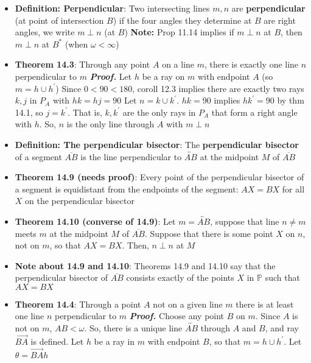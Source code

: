 \documentclass{report}
\begin{document}
\begin{itemize}
        \item \textbf{Definition: Perpendicular}: Two intersecting lines $m,n$ are \textbf{perpendicular} (at point of intersection $B$) if the four angles they determine at $B$ are right angles, we write $m\perp n$ (at $B$)
            \bigbreak \noindent 
            \textbf{Note:} Prop 11.14 implies if $m \perp n$ at $B$, then $m \perp n$ at $B^{*} $ (when $\omega < \infty $)
        \item \textbf{Theorem 14.3}: Through any point $A$ on a line $m$, there is exactly one line $n$ perpendicular to $m$
            \bigbreak \noindent 
            \textbf{\textit{Proof.}} Let $h$ be a ray on $m$ with endpoint $A$ (so $m = h \cup h^{\prime} $)
            \bigbreak \noindent 
            Since $0 < 90 < 180$, coroll 12.3 implies there are exactly two rays $k,j$ in $P_{A}$ with $hk = hj = 90 $
            \bigbreak \noindent 
            Let $n = k \cup k^{\prime}$. $hk = 90$ implies $ hk^{\prime} = 90$ by thm 14.1, so $j = k^{\prime}$. That is, $k, k^{\prime}$ are the only rays in $P_{A}$ that form a right angle with $h$. So, $n$ is the only line through $A$ with $m \perp n$
        \item \textbf{Definition: The perpendicular bisector}: The \textbf{perpendicular bisector} of a segment $\overline{AB}$ is the line perpendicular to $\overleftrightarrow{AB}$ at the midpoint $M$ of $\overline{AB}$
        \item \textbf{Theorem 14.9 (needs proof)}: Every point of the perpendicular bisector of a segment is equidistant from the endpoints of the segment: $AX = BX$ for all $X$ on the perpendicular bisector
        \item \textbf{Theorem 14.10 (converse of 14.9)}: Let $m = \overleftrightarrow{AB}$, suppose that line $n\ne m$ meets $m$ at the midpoint $M$ of $\overline{AB}$. Suppose that there is some point $X$ on $n$, not on $m$, so that $AX = BX$. Then, $n \perp n$ at $M$
        \item \textbf{Note about 14.9 and 14.10}: Theorems 14.9 and 14.10 say that the perpendicular bisector of $\overline{AB}$ consists exactly of the points $X$ in $\mathbb{P}$ such that $AX = BX $
        \item \textbf{Theorem 14.4}: Through a point $A$ not on a given line $m$ there is at least one line $n$ perpendicular to $m$
            \bigbreak \noindent 
            \textbf{\textit{Proof.}} Choose any point $B$ on $m$. Since $A$ is not on $m$, $AB < \omega$. So, there is a unique line $\overleftrightarrow{AB}$ through $A$ and $B$, and ray $\overrightarrow{BA}$ is defined. Let $h$ be a ray in $m$ with endpoint $B$, so that $m = h \cup h^{\prime}$. Let $\theta  = \overrightarrow{BA}h $

\end{itemize}
\end{document}
